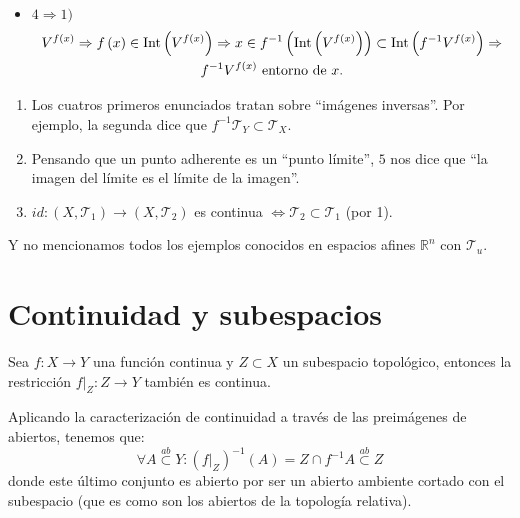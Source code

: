 \begin{demo}
\begin{itemize}
    \item $4 \Rightarrow 1)$
    \begin{gather*}
        V^{f\left( x \right)} \Rightarrow f\left( x \right) \in \operatorname{Int}\left( V^{f\left( x \right)} \right) \Rightarrow x \in f^{-1}\left( \operatorname{Int}\left( V^{f\left( x \right)} \right) \right) \subset \operatorname{Int}\left( f^{-1}V^{f\left( x \right)} \right) \Rightarrow \\
        f^{-1}V^{f\left( x \right) } \text{ entorno de } x.
    \end{gather*}
\end{itemize}
\end{demo}

\begin{obs}
\begin{enumerate}
    \item Los cuatros primeros enunciados tratan sobre ``imágenes inversas''. Por ejemplo, la segunda dice que $f^{-1}\mathcal{T}_Y \subset \mathcal{T}_X$.
    \item Pensando que un punto adherente es un ``punto límite'', $5$ nos dice que ``la imagen del límite es el límite de la imagen''.
    \item $id: \left( X, \mathcal{T}_1 \right) \rightarrow \left( X, \mathcal{T}_2 \right)$ es continua $\Leftrightarrow \mathcal{T}_2 \subset \mathcal{T}_1$ (por 1). 
\end{enumerate}
Y no mencionamos todos los ejemplos conocidos en espacios afines $\mathbb{R}^n$ con $\mathcal{T}_u$.
\end{obs}


\section{Continuidad y subespacios}%
\label{sec:continuidad_y_subespacios}
\begin{prop}
Sea $f: X \rightarrow Y$ una función continua y $Z \subset X$ un subespacio topológico, entonces la restricción $f|_Z : Z \rightarrow Y$ también es continua.
\end{prop}
\begin{demo}
Aplicando la caracterización de continuidad a través de las preimágenes de abiertos, tenemos que:
\[
\forall A \stackrel{ab}{\subset} Y : \left( f|_Z \right)^{-1} \left( A \right) = Z \cap f^{-1} A \stackrel{ab}{\subset} Z
\]
donde este último conjunto es abierto por ser un abierto ambiente cortado con el subespacio (que es como son los abiertos de la topología relativa).
\end{demo}

